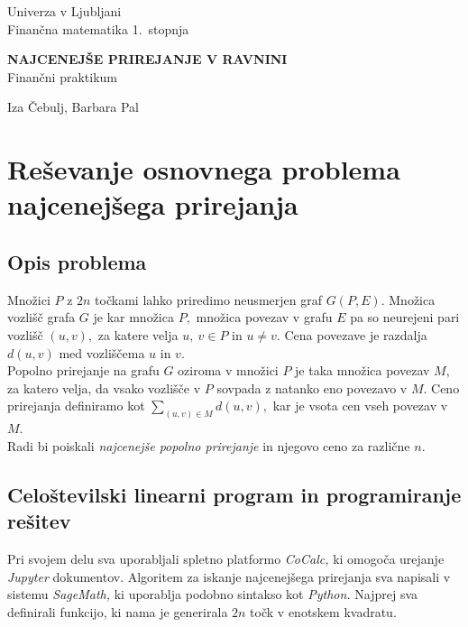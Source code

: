 \documentclass[a4paper, 11pt]{article}
\newcommand{\program}{Finančna matematika 1.~stopnja} %
\newcommand{\imeavtorja}{Iza Čebulj, Barbara Pal} %
\newcommand{\naslovdela}{Najcenejše prirejanje v ravnini}
\newcommand{\letnica}{2023}
\newcommand{\predmet}{Finančni praktikum}
\begin{document}
\thispagestyle{empty}
\begin{center}
\begin{minipage}{0.75\linewidth}
    \centering
    {\Large Univerza v Ljubljani \\ \program}
    \\
    \vspace{3cm}

    {\uppercase{\Large \textbf{\naslovdela}}} \\ \predmet\\
    \vspace{3cm}

    {\Large \imeavtorja\par}
    \vspace{9cm}

\end{minipage}
\end{center}

\noindent{\large
Ljubljana, \letnica}
\pagebreak

\thispagestyle{empty}
\tableofcontents
\pagebreak

\section{Reševanje osnovnega problema najcenejšega prirejanja}
\subsection{Opis problema}
Množici $P$ z $2n$ točkami lahko priredimo neusmerjen graf $G(P,E).$
Množica vozlišč grafa $G$ je kar množica $P,$ množica povezav v grafu $E$ pa so neurejeni pari vozlišč $(u,v),$ za katere velja $u,~v \in P$ in $u \neq v.$ 
Cena povezave je razdalja $d(u,v)$ med vozliščema $u$ in $v.$ \\
Popolno prirejanje na grafu $G$ oziroma v množici $P$ je taka množica povezav $M,$ za katero velja, da vsako vozlišče v $P$ sovpada z natanko eno povezavo v $M$.
Ceno prirejanja definiramo kot $\sum_{(u,v) \in M} d(u,v),$ kar je vsota cen vseh povezav v $M.$ \\
Radi bi poiskali \emph{najcenejše popolno prirejanje} in njegovo ceno za različne $n.$

\subsection{Celoštevilski linearni program in programiranje rešitev}
Pri svojem delu sva uporabljali spletno platformo \emph{CoCalc,} ki omogoča urejanje \emph{Jupyter} dokumentov.
Algoritem za iskanje najcenejšega prirejanja sva napisali v sistemu \emph{SageMath,} ki uporablja podobno sintakso kot \emph{Python.}
Najprej sva definirali funkcijo, ki nama je generirala $2n$ točk v enotskem kvadratu.
\end{document}
